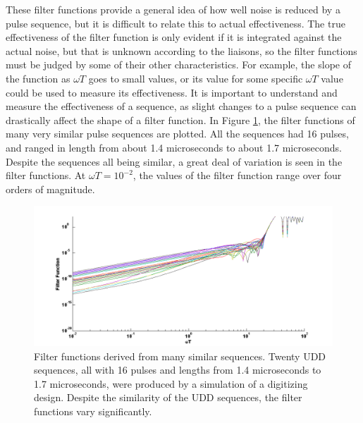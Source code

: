 \documentclass[pdftex,12pt,a4paper]{article}
\begin{document}
These filter functions provide a general idea of how well noise is reduced by a pulse sequence, but it is difficult to relate this to actual effectiveness. The true effectiveness of the filter function is only evident if it is integrated against the actual noise, but that is unknown according to the liaisons, so the filter functions must be judged by some of their other characteristics. For example, the slope of the function as $\omega T$ goes to small values, or its value for some specific $\omega T$ value could be used to measure its effectiveness. It is important to understand and measure the effectiveness of a sequence, as slight changes to a pulse sequence can drastically affect the shape of a filter function. In Figure \ref{fig:filter2}, the filter functions of many very similar pulse sequences are plotted. All the sequences had 16 pulses, and ranged in length from about 1.4 microseconds to about 1.7 microseconds. Despite the sequences all being similar, a great deal of variation is seen in the filter functions. At $\omega T=10^{-2}$, the values of the filter function range over four orders of magnitude.


\begin{figure}[H]
  \centering
    \includegraphics[width=\textwidth]{erroranalysis1.png}
  \caption{Filter functions derived from many similar sequences. Twenty UDD sequences, all with 16 pulses and lengths from 1.4 microseconds to 1.7 microseconds, were produced by a simulation of a digitizing design. Despite the similarity of the UDD sequences, the filter functions vary significantly.}
  \label{fig:filter2}
\end{figure}
\end{document}

